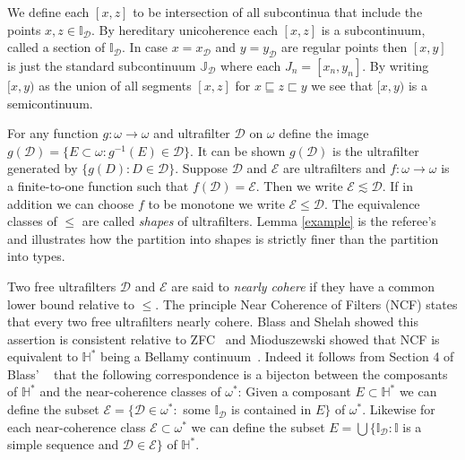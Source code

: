 \documentclass[12pt]{article}
\theoremstyle{plain}
\theoremstyle{definition}
\newcommand{\W}{\ensuremath{\omega}}
\newcommand{\II}{\ensuremath{\mathbb I}}
\newcommand{\JJ}{\ensuremath{\mathbb J}}
\newcommand{\HH}{\ensuremath{\mathbb H}}
\newcommand{\0}{\ensuremath{\varnothing}}
\newcommand{\cD}{\ensuremath{\mathcal D}}
\newcommand{\sE}{\ensuremath{\mathscr E}}
\newcommand{\cE}{\ensuremath{\mathcal E}}
\begin{document}
	We define each $[x,z]$ to be intersection of all subcontinua that include the points $x,z \in \II_\cD$. By hereditary unicoherence each $[x,z]$ is a subcontinuum, called a section of $\II_\cD$. In case $x=x_\cD$ and $y=y_\cD$ are regular points then $[x,y]$ is just the standard subcontinuum $\JJ_\cD$ where each $J_n= [x_n,y_n]$. By writing $[x,y)$ as the union of all segments $[x,z]$ for $x \sqsubseteq z \sqsubset y$ we see that $[x,y)$ is a semicontinuum.
	
	
	For any function $g \colon \W \to \W$ and ultrafilter $\cD$ on $\W$ define the image 
	$g(\cD) = \{E \subset \W \colon g^{-1}(E) \in \cD\}$. 
	It can be shown $g(\cD)$ is the ultrafilter generated by $\{g(D) \colon D \in \cD\}$.  
	Suppose $\cD$ and $\cE$ are ultrafilters and $f \colon \W \to \W$ is a finite-to-one function such that 
	$f(\cD) = \cE$. Then we write $\cE \lesssim \cD$. 
	If in addition we can choose $f$ to be monotone
	we write $\cE \le \cD$. The equivalence classes of $\le$ are called \textit{shapes} of ultrafilters.
	Lemma \ref{example} is the referee's and illustrates how the partition into shapes is strictly finer than the partition
	into types. 
	
	Two free ultrafilters $\cD$ and $\cE$ are said to \textit{nearly cohere} if they have a common lower bound relative to $\le$. The principle Near Coherence of Filters (NCF) states that every two free ultrafilters nearly cohere. 
	Blass and Shelah showed this assertion is consistent relative to ZFC~\cite{NCF3} 
	and Mioduszewski showed that NCF is equivalent to $\HH^*$ being a Bellamy continuum~\cite{MiodComposants}. 
	Indeed it follows from Section 4 of Blass' ~\cite{NCF2} that the following correspondence is a bijecton  
	between the composants of $\HH^*$ and the near-coherence classes of $\W^*$: 
	Given a composant $E \subset \HH^*$ we can define the subset $\sE = \{\cD \in \W^* \colon$ some $\II_\cD$ 
	is contained in $E\}$ of $\W^*$. Likewise for each near-coherence class $\sE\subset \W^*$ 
	we can define the subset $E = \bigcup \{\II_\cD  \colon \II$ is a simple sequence and $\cD \in \sE\}$ of $\HH^*$. 
	
	
	
\end{document}
